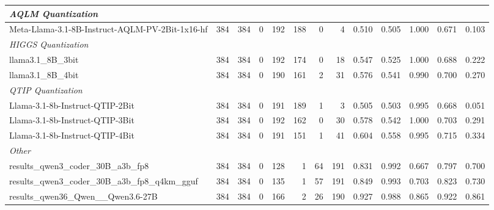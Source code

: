\begin{table}[htbp]
{\begin{tabular}{lrrrrrrrrrrrr}
    \midrule
    \multicolumn{13}{l}{\textit{AQLM Quantization}} \\
    \midrule
    Meta-Llama-3.1-8B-Instruct-AQLM-PV-2Bit-1x16-hf & 384 & 384 & 0 & 192 & 188 & 0 & 4 & 0.510 & 0.505 & 1.000 & 0.671 & 0.103 \\
    \midrule
    \multicolumn{13}{l}{\textit{HIGGS Quantization}} \\
    \midrule
    llama3.1\_8B\_3bit & 384 & 384 & 0 & 192 & 174 & 0 & 18 & 0.547 & 0.525 & 1.000 & 0.688 & 0.222 \\
    llama3.1\_8B\_4bit & 384 & 384 & 0 & 190 & 161 & 2 & 31 & 0.576 & 0.541 & 0.990 & 0.700 & 0.270 \\
    \midrule
    \multicolumn{13}{l}{\textit{QTIP Quantization}} \\
    \midrule
    Llama-3.1-8b-Instruct-QTIP-2Bit & 384 & 384 & 0 & 191 & 189 & 1 & 3 & 0.505 & 0.503 & 0.995 & 0.668 & 0.051 \\
    Llama-3.1-8b-Instruct-QTIP-3Bit & 384 & 384 & 0 & 192 & 162 & 0 & 30 & 0.578 & 0.542 & 1.000 & 0.703 & 0.291 \\
    Llama-3.1-8b-Instruct-QTIP-4Bit & 384 & 384 & 0 & 191 & 151 & 1 & 41 & 0.604 & 0.558 & 0.995 & 0.715 & 0.334 \\
    \midrule
    \multicolumn{13}{l}{\textit{Other}} \\
    \midrule
    results\_qwen3\_coder\_30B\_a3b\_fp8 & 384 & 384 & 0 & 128 & 1 & 64 & 191 & 0.831 & 0.992 & 0.667 & 0.797 & 0.700 \\
    results\_qwen3\_coder\_30B\_a3b\_fp8\_q4km\_gguf & 384 & 384 & 0 & 135 & 1 & 57 & 191 & 0.849 & 0.993 & 0.703 & 0.823 & 0.730 \\
    results\_qwen36\_Qwen\_\_Qwen3.6-27B & 384 & 384 & 0 & 166 & 2 & 26 & 190 & 0.927 & 0.988 & 0.865 & 0.922 & 0.861 \\
    \bottomrule
  \end{tabular}
  }
\end{table}

